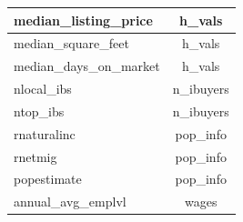 \begin{table}
\begin{tabular}{| l || c |}
    median\_listing\_price &           h\_vals \\ \hline
    median\_square\_feet &           h\_vals \\ \hline
    median\_days\_on\_market &           h\_vals \\ \hline
    nlocal\_ibs &        n\_ibuyers \\ \hline
    ntop\_ibs &        n\_ibuyers \\ \hline
    rnaturalinc &         pop\_info \\ \hline
    rnetmig &         pop\_info \\ \hline
    popestimate &         pop\_info \\ \hline
    annual\_avg\_emplvl &            wages \\ \hline
    \end{tabular}
\end{table}

